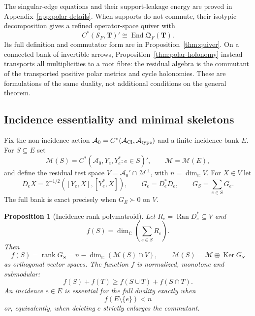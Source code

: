 \documentclass[11pt]{article}
\numberwithin{equation}{section}
\newtheorem{proposition}[theorem]{Proposition}
\theoremstyle{definition}
\theoremstyle{remark}
\newcommand{\C}{\mathbb C}
\newcommand{\rank}{\operatorname{rank}}
\newcommand{\Ker}{\operatorname{Ker}}
\newcommand{\Ran}{\operatorname{Ran}}
\newcommand{\End}{\operatorname{End}}
\newcommand{\M}{\mathcal M}
\begin{document}
The singular-edge equations and their support-leakage energy are proved in
Appendix~\ref{app:polar-details}.  When supports do not commute, their
isotypic decomposition gives a refined operator-space quiver with
\begin{equation}
 C^*(\mathcal S_F,\bm T)'\cong\End\mathfrak Q_F(\bm T).
 \label{eq:quiver-main-summary}
\end{equation}
Its full definition and commutator form are in
Proposition~\ref{thm:quiver}.  On a connected bank of invertible arrows,
Proposition~\ref{thm:polar-holonomy} instead transports all multiplicities to
a root fibre: the residual algebra is the commutant of the transported
positive polar metrics and cycle holonomies.  These are formulations of the
same duality, not additional conditions on the general theorem.


\subsection{Incidence essentiality and minimal skeletons}
\label{sec:incidence-skeleton}

Fix the non-incidence action
$\mathcal A_0=C^*(\mathcal A_{\rm Cl},\mathcal A_{\rm type})$ and a finite
incidence bank $E$.  For $S\subseteq E$ set
\[
 \M(S)=C^*(\mathcal A_0,Y_e,Y_e^*:e\in S)',
 \qquad \M=\M(E),
\]
and define the residual test space
$V=\mathcal A_0'\cap\M^\perp$, with $n=\dim_\C V$.  For $X\in V$ let
\begin{equation}
 D_eX=2^{-1/2}([Y_e,X],[Y_e^*,X]),
 \qquad G_e=D_e^*D_e,
 \qquad G_S=\sum_{e\in S}G_e.
 \label{eq:incidence-forms}
\end{equation}
The full bank is exact precisely when $G_E\succ0$ on $V$.

\begin{proposition}[Incidence rank polymatroid]
\label{thm:incidence-polymatroid}
Let $R_e=\Ran D_e^*\subseteq V$ and
\begin{equation}
 f(S)=\dim_\C\!\left(\sum_{e\in S}R_e\right).
 \label{eq:incidence-rank}
\end{equation}
Then
\begin{equation}
 f(S)=\rank G_S
     =n-\dim_\C(\M(S)\cap V),
 \qquad
 \M(S)=\M\oplus\Ker G_S
 \label{eq:incidence-kernel}
\end{equation}
as orthogonal vector spaces.  The function $f$ is normalized, monotone and
submodular:
\begin{equation}
 f(S)+f(T)\ge f(S\cup T)+f(S\cap T).
 \label{eq:incidence-submodular}
\end{equation}
An incidence $e\in E$ is essential for the full duality exactly when
\begin{equation}
 f(E\setminus\{e\})<n
 \label{eq:essential-incidence}
\end{equation}
or, equivalently, when deleting $e$ strictly enlarges the commutant.
\end{proposition}
\end{document}
